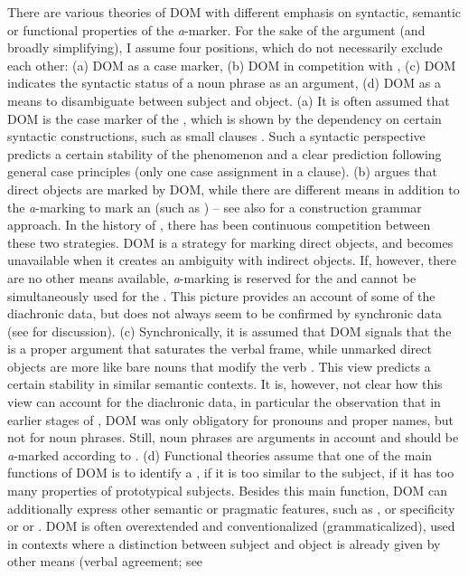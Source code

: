 \documentclass[output=paper]{LSP/langsci}
\begin{document}
There are various theories of DOM with different emphasis on syntactic, semantic or functional properties of the \textit{a}-marker. For the sake of the argument (and broadly simplifying), I assume four positions, which do not necessarily exclude each other: (a) DOM as a case marker, (b) DOM in competition with  , (c) DOM indicates the syntactic status of a noun phrase as an argument, (d) DOM as a means to disambiguate between subject and object. (a) It is often assumed that DOM is the case marker of the , which is shown by the dependency on certain syntactic constructions, such as small clauses  \citep{Brugeetal1996Accusative,Mondonedo2007Syntax,Ormazaletal2013Differential}. Such a syntactic perspective predicts a certain stability of the phenomenon and a clear prediction following general case principles (only one case assignment in a clause). (b) \citet{Company1998Interplay,Company2002Avance} argues that direct objects are marked by DOM, while there are different means in addition to the \textit{a}-marking to mark an  (such as ) – see also \citet{Delbecque1998Frames,Delbecque2002Construction} for a construction grammar approach. In the history of , there has been continuous competition between these two strategies. DOM is a strategy for marking direct objects, and becomes unavailable when it creates an ambiguity with indirect objects. If, however, there are no other means available, \textit{a}-marking is reserved for the  and cannot be simultaneously used for the . This picture provides an account of some of the diachronic data, but does not always seem to be confirmed by synchronic data (see \citealt{Melisetal2009Interplay} for discussion). (c) Synchronically, it is assumed that DOM signals that the  is a proper argument that saturates the verbal frame, while unmarked direct objects are more like bare nouns that modify the verb \citep{Chungetal2004Restriction,Lopez2012Indefinite}. This view predicts a certain stability in similar semantic contexts. It is, however, not clear how this view can account for the diachronic data, in particular the observation that in earlier stages of , DOM was only obligatory for pronouns and proper names, but not for  noun phrases. Still,  noun phrases are arguments in  account and should be \textit{a}-marked according to \citet{Lopez2012Indefinite}. (d) Functional theories assume that one of the main functions of DOM is to identify a , if it is too similar to the subject, \ie if it has too many properties of prototypical subjects. Besides this main function, DOM can additionally express other semantic or pragmatic features, such as ,  or specificity \citep{Comrie1975Definite,Bossong1985Differentielle,Aissen2003Differential} or  \citep{Torrego1999Gramatica} or  \citep{vonHeusingeretal2011Affectedness}. DOM is often overextended and conventionalized (grammaticalized), \ie used in contexts where a distinction between subject and object is already given by other means (\eg  verbal agreement; see 
\end{document}

